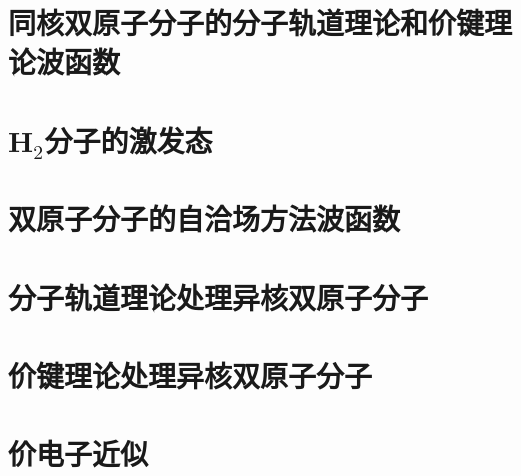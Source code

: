 \section{同核双原子分子的分子轨道理论和价键理论波函数}

\section{H$_2$分子的激发态}

\section{双原子分子的自洽场方法波函数}

\section{分子轨道理论处理异核双原子分子}

\section{价键理论处理异核双原子分子}

\section{价电子近似}